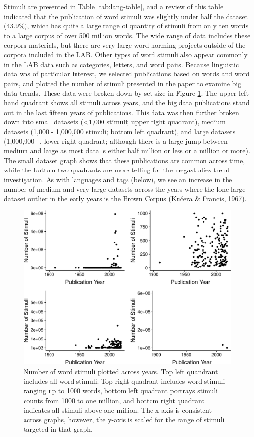 \documentclass[english,,man]{apa6}
\theoremstyle{definition}
\theoremstyle{definition}
\theoremstyle{definition}
\theoremstyle{remark}
\begin{document}
Stimuli are presented in Table \ref{tab:lang-table}, and a review of
this table indicated that the publication of word stimuli was slightly
under half the dataset (43.9\%), which has quite a large range of
quantity of stimuli from only ten words to a large corpus of over 500
million words. The wide range of data includes these corpora materials,
but there are very large word norming projects outside of the corpora
included in the LAB. Other types of word stimuli also appear commonly in
the LAB data such as categories, letters, and word pairs. Because
linguistic data was of particular interest, we selected publications
based on words and word pairs, and plotted the number of stimuli
presented in the paper to examine big data trends. These data were
broken down by set size in Figure \ref{fig:word-fig}. The upper left
hand quadrant shows all stimuli across years, and the big data
publications stand out in the last fifteen years of publications. This
data was then further broken down into small datasets (\textless{}1,000
stimuli; upper right quadrant), medium datasets (1,000 - 1,000,000
stimuli; bottom left quadrant), and large datasets (1,000,000+, lower
right quadrant; although there is a large jump between medium and large
as most data is either half million or less or a million or more). The
small dataset graph shows that these publications are common across
time, while the bottom two quadrants are more telling for the
megastudies trend investigation. As with languages and tags (below), we
see an increase in the number of medium and very large datasets across
the years where the lone large dataset outlier in the early years is the
Brown Corpus (Kučera \& Francis, 1967).

\begin{figure}
\centering
\includegraphics{LAB_files/figure-latex/word-fig-1.pdf}
\caption{\label{fig:word-fig}Number of word stimuli plotted across years.
Top left quandrant includes all word stimuli. Top right quadrant
includes word stimuli ranging up to 1000 words, bottom left quadrant
portrays stimuli counts from 1000 to one million, and bottom right
quadrant indicates all stimuli above one million. The x-axis is
consistent across graphs, however, the y-axis is scaled for the range of
stimuli targeted in that graph.}
\end{figure}
\end{document}
